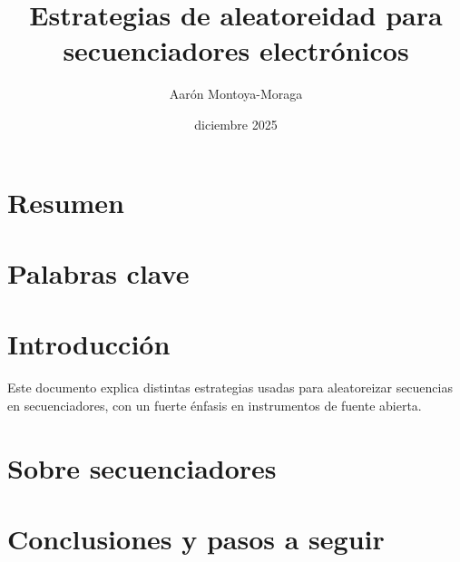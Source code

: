 \documentclass{article}
\title{Estrategias de aleatoreidad para secuenciadores electrónicos}
\author{Aarón Montoya-Moraga}
\date{diciembre 2025}
\begin{document}
\maketitle

\renewcommand*\contentsname{Tabla de contenidos}

\tableofcontents

\clearpage

\section{Resumen}


\section{Palabras clave}

\clearpage

\section{Introducción}

Este documento explica distintas estrategias usadas para aleatoreizar secuencias en secuenciadores, con un fuerte énfasis en instrumentos de fuente abierta.



\clearpage

\section{Sobre secuenciadores}



\section{Conclusiones y pasos a seguir}



\cite{korgBerlin}

\clearpage

\printbibliography[title={Bibliografía}, heading=bibintoc]
\end{document}
